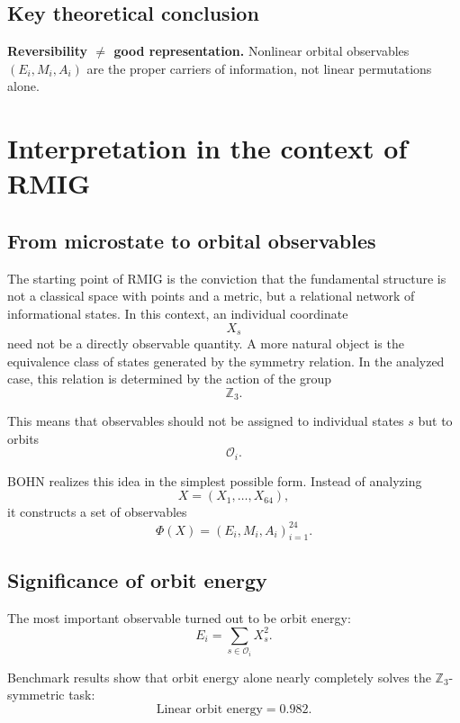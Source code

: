 \documentclass[11pt,a4paper]{report}
\begin{document}
\subsection{Key theoretical conclusion}

\textbf{Reversibility $\neq$ good representation.} Nonlinear orbital observables $(E_i, M_i, A_i)$ are the proper carriers of information, not linear permutations alone.


\section{Interpretation in the context of RMIG}

\subsection{From microstate to orbital observables}

The starting point of RMIG is the conviction that the fundamental structure is not a classical space with points and a metric, but a relational network of informational states. In this context, an individual coordinate
\[
X_s
\]
need not be a directly observable quantity. A more natural object is the equivalence class of states generated by the symmetry relation. In the analyzed case, this relation is determined by the action of the group
\[
\mathbb{Z}_3.
\]

This means that observables should not be assigned to individual states $s$ but to orbits
\[
\mathcal{O}_i.
\]

BOHN realizes this idea in the simplest possible form. Instead of analyzing
\[
X = (X_1,\ldots,X_{64}),
\]
it constructs a set of observables
\[
\Phi(X) = (E_i, M_i, A_i)_{i=1}^{24}.
\]

\subsection{Significance of orbit energy}

The most important observable turned out to be orbit energy:
\[
E_i = \sum_{s\in\mathcal{O}_i} X_s^2.
\]

Benchmark results show that orbit energy alone nearly completely solves the $\mathbb{Z}_3$-symmetric task:
\[
\text{Linear orbit energy} = 0.982.
\]
\end{document}
